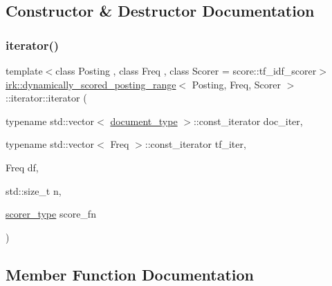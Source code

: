 \subsection{Constructor \& Destructor Documentation}
\mbox{\label{classirk_1_1dynamically__scored__posting__range_1_1iterator_a05b9da8cd5f26527fd6813784579eec4}} 
\subsubsection{\texorpdfstring{iterator()}{iterator()}}
{\footnotesize\ttfamily template$<$class Posting , class Freq , class Scorer  = score\+::tf\+\_\+idf\+\_\+scorer$>$ \\
\mbox{\hyperlink{classirk_1_1dynamically__scored__posting__range}{irk\+::dynamically\+\_\+scored\+\_\+posting\+\_\+range}}$<$ Posting, Freq, Scorer $>$\+::iterator\+::iterator (\begin{DoxyParamCaption}\item[{typename std\+::vector$<$ \mbox{\hyperlink{classirk_1_1dynamically__scored__posting__range_a30b30964cca4601be1eab249b12bd825}{document\+\_\+type}} $>$\+::const\+\_\+iterator}]{doc\+\_\+iter,  }\item[{typename std\+::vector$<$ Freq $>$\+::const\+\_\+iterator}]{tf\+\_\+iter,  }\item[{Freq}]{df,  }\item[{std\+::size\+\_\+t}]{n,  }\item[{\mbox{\hyperlink{classirk_1_1dynamically__scored__posting__range_aa82b83ad2a96aeda0fff2cb233d877f9}{scorer\+\_\+type}}}]{score\+\_\+fn }\end{DoxyParamCaption})\hspace{0.3cm}{\ttfamily [inline]}}



\subsection{Member Function Documentation}
\mbox{\label{classirk_1_1dynamically__scored__posting__range_1_1iterator_ab8d1be496c6fd7a75435818004b57c1e}} 
